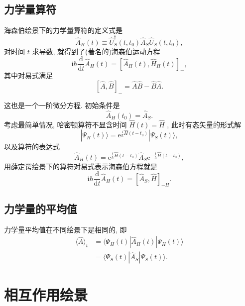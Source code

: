 \subsection{ 力学量算符}

海森伯绘景下的力学量算符的定义式是
\begin{equation}
   \hat A_H(t)\equiv\hat U_S^\dagger(t, t_0)\hat A_S\hat U_S(t, t_0), 
\end{equation}
对时间 $t$ 求导数, 就得到了(著名的)海森伯运动方程
\begin{equation}
   \mathrm i\hbar \frac{\mathrm d}{\mathrm dt}\hat A_H(t)=\left[ \hat A_H(t), \hat H_H(t) \right]_-, 
\end{equation}
其中对易式满足
\begin{equation}
   \left[ \hat A, \hat B \right]_-=\hat A\hat B-\hat B\hat A. 
\end{equation}


这也是一个一阶微分方程. 初始条件是
\begin{equation}
   \hat A_H(t_0)=\hat A_S. 
\end{equation}
考虑最简单情况, 哈密顿算符不显含时间 $\hat H(t)=\hat H$ , 此时有态矢量的形式解
\begin{equation}
   |\Psi_H(t)\rangle=\mathrm e^{\frac{\mathrm i}{\hbar}\hat H(t-t_0)}|\Psi_S(t)\rangle, 
\end{equation}
以及算符的表达式
\begin{equation}
   \hat A_H(t)=\mathrm e^{\frac{\mathrm i}{\hbar}\hat H(t-t_0)}\hat A_S\mathrm e^{-\frac{\mathrm i}{\hbar}\hat H(t-t_0)}, 
\end{equation}
用薛定谔绘景下的算符对易式表示海森伯方程就是
\begin{equation}
   \mathrm i\hbar \frac{\mathrm d}{\mathrm dt}\hat A_H(t)=\left[ \hat A_S, \hat H \right]_{-H}. 
\end{equation}

\subsection{ 力学量的平均值}

力学量平均值在不同绘景下是相同的, 即
   \begin{align}
      \langle\hat A\rangle_t&=\langle \Psi_H(t)|\hat A_H(t)|\Psi_H(t)\rangle\nonumber\\
      &=\langle\Psi_S(t)|\hat A_S|\Psi_S(t)\rangle. 
   \end{align}

\section{ 相互作用绘景}

